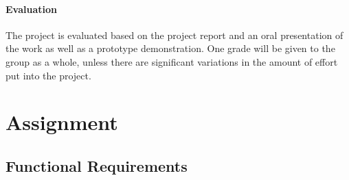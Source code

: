 \paragraph{Evaluation}
The project is evaluated based on the project report and an oral presentation of
the work as well as a prototype demonstration. One grade will be given to the
group as a whole, unless there are significant variations in the amount of
effort put into the project.

\section{Assignment}\label{intro:our-assignment-interpretation}


\subsection{Functional Requirements}


